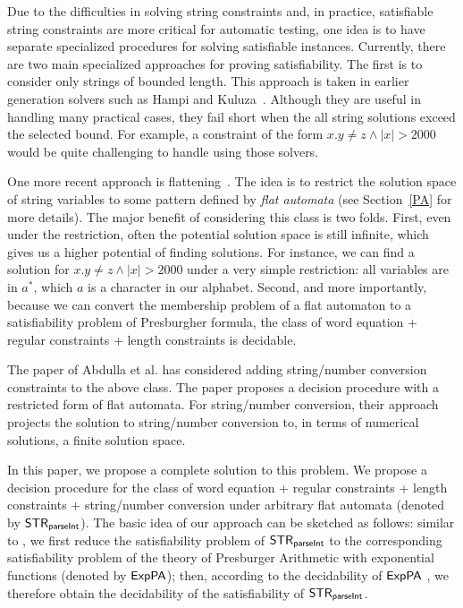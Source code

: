Due to the difficulties in solving string constraints and, in practice, satisfiable string constraints are more critical for automatic testing, one idea is to have separate specialized procedures for solving satisfiable instances. 
Currently, there are two main specialized approaches for proving satisfiability.
The first is to consider only strings of bounded length.
This approach is taken in earlier generation solvers such as Hampi and Kuluza~\cite{}.
Although they are useful in handling many practical cases, they fail short when the all string solutions exceed the selected bound.
For example, a constraint of the form $x.y \neq z  \wedge |x| > 2000$ would be quite challenging to handle using those solvers.

One more recent approach is flattening~\cite{A}.
The idea is to restrict the solution space of string variables to some pattern defined by \emph{flat automata} (see Section~\ref{PA} for more details). 
The major benefit of considering this class is two folds.
First, even under the restriction, often the potential solution space is still infinite, which gives us a higher potential of finding solutions.
For instance, we can find a solution for $x.y \neq z  \wedge |x| > 2000$ under a very simple restriction: all variables are in $a^*$, which $a$ is a character in our alphabet.
Second, and more importantly, because we can convert the membership problem of a flat automaton to a satisfiability problem of Presburgher formula, the class of word equation + regular constraints + length constraints is decidable.

The paper of Abdulla et al. has considered adding string/number conversion constraints to the above class.
The paper proposes a decision procedure with a restricted form of flat automata.
For string/number conversion, their approach projects the solution to string/number conversion to, in terms of numerical solutions, a finite solution space.

In this paper, we propose a complete solution to this problem.
We propose a decision procedure for the class of word equation + regular constraints + length constraints + string/number conversion under arbitrary flat automata (denoted by ${\sf STR}_{\textsf{parseInt}}$).
The basic idea of our approach can be sketched as follows:  similar to \cite{A}, we first reduce the satisfiability problem of ${\sf STR}_{\textsf{parseInt}}$ to the corresponding satisfiability problem of the theory of Presburger Arithmetic with exponential functions (denoted by ${\sf ExpPA}$); then, according to the decidability of ${\sf ExpPA}$ \cite{Semenov84}, we therefore obtain the decidability of the satisfiability of ${\sf STR}_{\textsf{parseInt}}$.  

